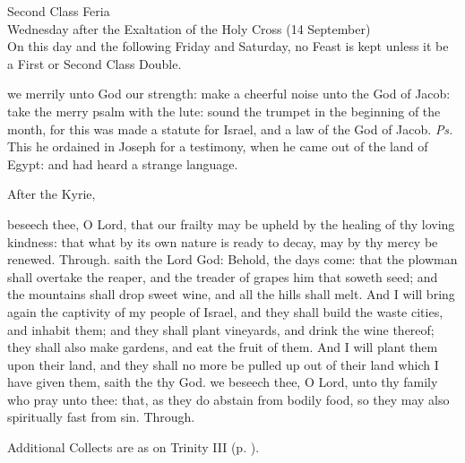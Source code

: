\begin{inhead}
    {Second Class Feria\\
Wednesday after the Exaltation of the Holy Cross (14 September)\\
On this day and the following Friday and Saturday, no Feast is kept unless it be a First or Second Class Double.}
\end{inhead}
\par\noindent
{}
\introit
{} we merrily unto God our strength: make a cheerful noise unto the God of Jacob: take the merry psalm with the lute: sound the trumpet in the beginning of the month, for this was made a statute for Israel, and a law of the God of Jacob. \textit{Ps.} This he ordained in Joseph for a testimony, when he came out of the land of Egypt: and had heard a strange language.
\begin{rubric}
    After the Kyrie,
\end{rubric}
\collect
{} beseech thee, O Lord, that our frailty may be upheld by the healing of thy loving kindness: that what by its own nature is ready to decay, may by thy mercy be renewed. Through.
 saith the Lord God: Behold, the days come: that the plowman shall overtake the reaper, and the treader of grapes him that soweth seed; and the mountains shall drop sweet wine, and all the hills shall melt. And I will bring again the captivity of my people of Israel, and they shall build the waste cities, and inhabit them; and they shall plant vineyards, and drink the wine thereof; they shall also make gardens, and eat the fruit of them. And I will plant them upon their land, and they shall no more be pulled up out of their land which I have given them, saith the  thy God.
\collect
{} we beseech thee, O Lord, unto thy family who pray unto thee: that, as they do abstain from bodily food, so they may also spiritually fast from sin. Through.
\begin{rubric}
    Additional Collects are as on Trinity III (p. \pageref{TrinityIIICollect}).
\end{rubric}

